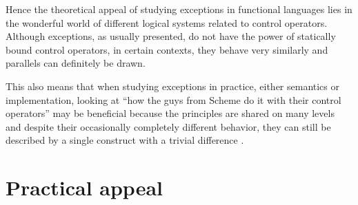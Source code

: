 Hence the theoretical appeal of studying exceptions in functional languages lies in the wonderful
world of different logical systems related to control operators. Although exceptions,
as usually presented, do not have the power of statically bound control operators,
in certain contexts, they behave very similarly and parallels can definitely be drawn.

This also means that when studying exceptions in practice, either semantics or implementation,
looking at ``how the guys from Scheme do it with their control operators''
may be beneficial because the principles are shared on many levels and despite their
occasionally completely different behavior, they can still be described by a single construct
with a trivial difference \cite{thielecke01}.

\section{Practical appeal}



\label{chap:dependent-types}






































































